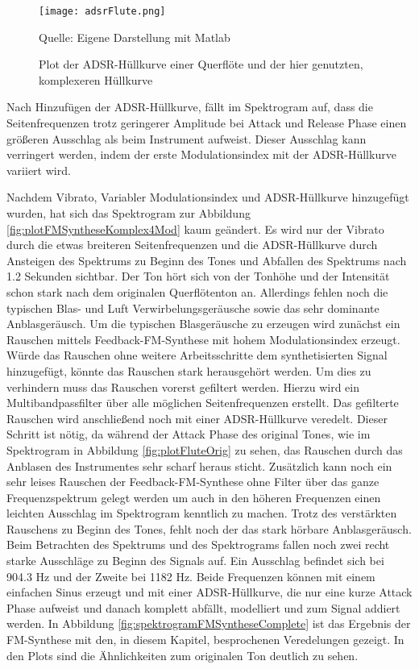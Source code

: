 \begin{figure} [ht]
\centering
  \texttt{[image: adsrFlute.png]}
\caption{Plot der ADSR-Hüllkurve einer Querflöte und der hier genutzten, komplexeren Hüllkurve}
\label{fig:adsrFlute}
Quelle: Eigene Darstellung mit Matlab
\end{figure}

Nach Hinzufügen der ADSR-Hüllkurve, fällt im Spektrogram auf, dass die Seitenfrequenzen trotz geringerer Amplitude bei Attack und Release Phase einen größeren Ausschlag als beim Instrument aufweist. Dieser Ausschlag kann verringert werden, indem der erste Modulationsindex mit der ADSR-Hüllkurve variiert wird. 

Nachdem Vibrato, Variabler Modulationsindex und ADSR-Hüllkurve hinzugefügt wurden, hat sich das Spektrogram zur Abbildung \ref{fig:plotFMSyntheseKomplex4Mod} kaum geändert. Es wird nur der Vibrato durch die etwas breiteren Seitenfrequenzen und die ADSR-Hüllkurve durch Ansteigen des Spektrums zu Beginn des Tones und Abfallen des Spektrums nach 1.2 Sekunden sichtbar. Der Ton hört sich von der Tonhöhe und der Intensität schon stark nach dem originalen Querflötenton an. Allerdings fehlen noch die typischen Blas- und Luft Verwirbelungsgeräusche sowie das sehr dominante Anblasgeräusch. Um die typischen Blasgeräusche zu erzeugen wird zunächst ein Rauschen mittels Feedback-FM-Synthese mit hohem Modulationsindex erzeugt. Würde das Rauschen ohne weitere Arbeitsschritte dem synthetisierten Signal hinzugefügt, könnte das Rauschen stark herausgehört werden. Um dies zu verhindern muss das Rauschen vorerst gefiltert werden. Hierzu wird ein Multibandpassfilter über alle möglichen Seitenfrequenzen erstellt. Das gefilterte Rauschen wird anschließend noch mit einer ADSR-Hüllkurve veredelt. Dieser Schritt ist nötig, da während der Attack Phase des original Tones, wie im Spektrogram in Abbildung \ref{fig:plotFluteOrig} zu sehen, das Rauschen durch das Anblasen des Instrumentes sehr scharf heraus sticht. Zusätzlich kann noch ein sehr leises Rauschen der Feedback-FM-Synthese ohne Filter über das ganze Frequenzspektrum gelegt werden um auch in den höheren Frequenzen einen leichten Ausschlag im Spektrogram kenntlich zu machen. Trotz des verstärkten Rauschens zu Beginn des Tones, fehlt noch der das stark hörbare Anblasgeräusch. Beim Betrachten des Spektrums und des Spektrograms fallen noch zwei recht starke Ausschläge zu Beginn des Signals auf. Ein Ausschlag befindet sich bei 904.3 Hz und der Zweite bei 1182 Hz. Beide Frequenzen können mit einem einfachen Sinus erzeugt und mit einer ADSR-Hüllkurve, die nur eine kurze Attack Phase aufweist und danach komplett abfällt, modelliert und zum Signal addiert werden. In Abbildung \ref{fig:spektrogramFMSyntheseComplete} ist das Ergebnis der FM-Synthese mit den, in diesem Kapitel, besprochenen Veredelungen gezeigt. In den Plots sind die Ähnlichkeiten zum originalen Ton deutlich zu sehen.

